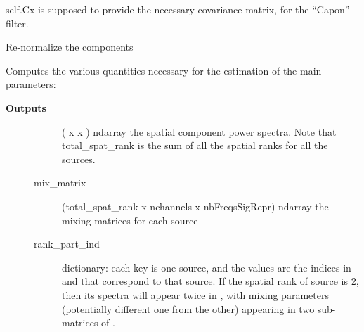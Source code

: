 \documentclass[letterpaper,10pt,english]{sphinxmanual}
\begin{document}
\begin{fulllineitems}
\begin{fulllineitems}
self.Cx is supposed to provide the necessary covariance matrix, for
the ``Capon'' filter.

\end{fulllineitems}


\begin{fulllineitems}
\label{reference/audiomodel:pyfasst.audioModel.FASST.renormalize_parameters}
Re-normalize the components

\end{fulllineitems}


\begin{fulllineitems}
\label{reference/audiomodel:pyfasst.audioModel.FASST.retrieve_subsrc_params}
Computes the various quantities necessary for the estimation of the
main parameters:
\begin{description}
\item[{\textbf{Outputs}}] \leavevmode\begin{description}
\item[{}] \leavevmode
( x  x ) ndarray
the spatial component power spectra. Note that total\_spat\_rank
is the sum of all the spatial ranks for all the sources.

\item[{mix\_matrix}] \leavevmode
(total\_spat\_rank x nchannels x nbFreqsSigRepr) ndarray
the mixing matrices for each source

\item[{rank\_part\_ind}] \leavevmode
dictionary: each key is one source, and the values are the indices
in  and  that correspond to that source.
If the spatial rank of source  is 2, then its spectra will appear
twice in , with mixing parameters (potentially
different one from the other) appearing in two sub-matrices of
.

\end{description}

\end{description}

\end{fulllineitems}


\end{fulllineitems}
\end{document}

